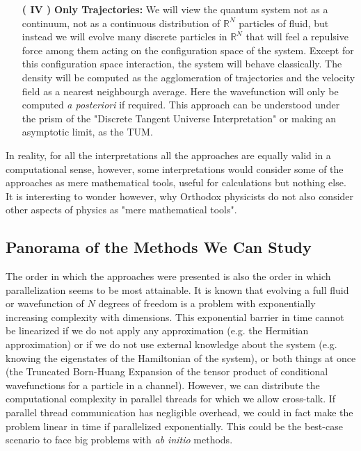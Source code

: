 \documentclass[11pt, a4paper]{article} %
\newcommand{\R}{\mathbb{R}} %
\begin{document}
\begin{enumerate}
\item[\bf ( IV ) ]{\bf Only Trajectories: } We will view the quantum system not as a continuum, not as a continuous distribution of $\R^N$ particles of fluid, but instead we will evolve many discrete particles in $\R^N$ that will feel a repulsive force among them acting on the configuration space of the system. Except for this configuration space interaction, the system will behave classically. The density will be computed as the agglomeration of trajectories and the velocity field as a nearest neighbourgh average. Here the wavefunction will only be computed {\em a posteriori} if required. This approach can be understood under the prism of the "Discrete Tangent Universe Interpretation" or making an asymptotic limit, as the TUM.

\end{enumerate}
In reality, for all the interpretations all the approaches are equally valid in a computational sense, however, some interpretations would consider some of the approaches as mere mathematical tools, useful for calculations but nothing else. It is interesting to wonder however, why Orthodox physicists do not also consider other aspects of physics as "mere mathematical tools".


\subsection*{ Panorama of the Methods We Can Study }

The order in which the approaches were presented is also the order in which parallelization seems to be most attainable. It is known that evolving a full fluid or wavefunction of $N$ degrees of freedom  is a problem with exponentially increasing complexity with dimensions. This exponential barrier in time cannot be linearized if we do not apply any approximation (e.g. the Hermitian approximation) or if we do not use external knowledge about the system (e.g. knowing the eigenstates of the Hamiltonian of the system), or both things at once (the Truncated Born-Huang Expansion of the tensor product of conditional wavefunctions for a particle in a channel). However, we can distribute the computational complexity in parallel threads for which we allow cross-talk. If parallel thread communication has negligible overhead, we could in fact make the problem linear in time if parallelized exponentially. This could be the best-case scenario to face big problems with {\em ab initio} methods. 
\end{document}
